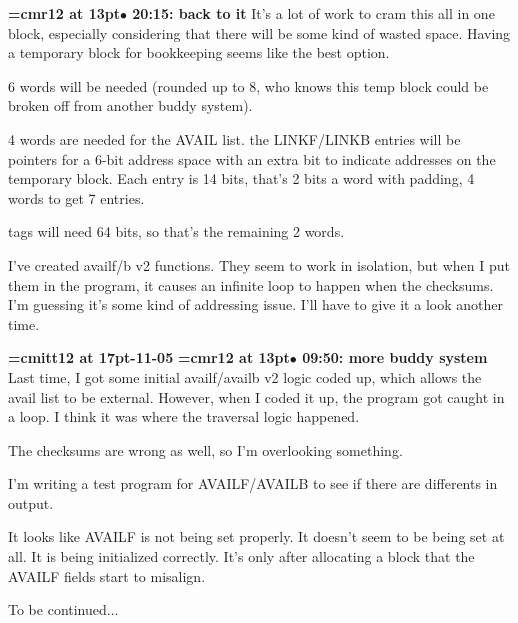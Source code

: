 {\smallskip\noindent\bf\font\titlefont=cmr12 at 13pt\titlefont $\bullet$ 20:15: back to it}\smallskip
It's a lot of work to cram this all in one block, especially considering that there will be some kind of wasted space. Having a temporary block for bookkeeping seems like the best option.
\par

6 words will be needed (rounded up to 8, who knows this temp block could be broken off from another buddy system).
\par

4 words are needed for the AVAIL list. the LINKF/LINKB entries will be pointers for a 6-bit address space with an extra bit to indicate addresses on the temporary block. Each entry is 14 bits, that's 2 bits a word with padding, 4 words to get 7 entries.
\par

tags will need 64 bits, so that's the remaining 2 words.
\par

I've created availf/b v2 functions. They seem to work in isolation, but when I put them in the program, it causes an infinite loop to happen when the checksums. I'm guessing it's some kind of addressing issue. I'll have to give it a look another time.
\par

{\medskip\noindent\bf\font\titlefont=cmitt12 at 17pt-11-05}\medskip
{\smallskip\noindent\bf\font\titlefont=cmr12 at 13pt\titlefont $\bullet$ 09:50: more buddy system}\smallskip
Last time, I got some initial availf/availb v2 logic coded up, which allows the avail list to be external. However, when I coded it up, the program got caught in a loop. I think it was where the traversal logic happened.
\par

The checksums are wrong as well, so I'm overlooking something.
\par

I'm writing a test program for AVAILF/AVAILB to see if there are differents in output.
\par

It looks like AVAILF is not being set properly. It doesn't seem to be being set at all. It is being initialized correctly. It's only after allocating a block that the AVAILF fields start to misalign.
\par

To be continued...
\par

